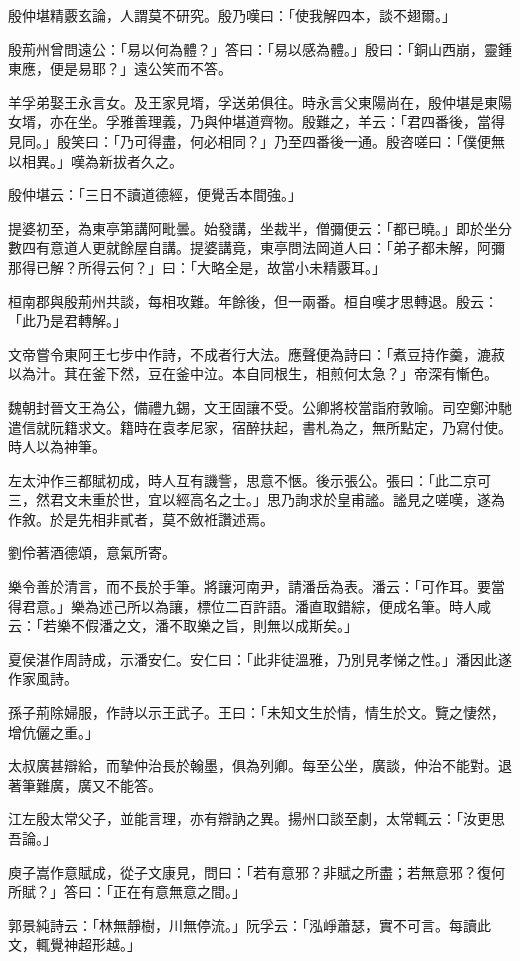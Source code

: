 殷仲堪精覈玄論，人謂莫不研究。殷乃嘆曰：「使我解四本，談不翅爾。」

殷荊州曾問遠公：「易以何為體？」答曰：「易以感為體。」殷曰：「銅山西崩，靈鍾東應，便是易耶？」遠公笑而不答。

羊孚弟娶王永言女。及王家見壻，孚送弟俱往。時永言父東陽尚在，殷仲堪是東陽女壻，亦在坐。孚雅善理義，乃與仲堪道齊物。殷難之，羊云：「君四番後，當得見同。」殷笑曰：「乃可得盡，何必相同？」乃至四番後一通。殷咨嗟曰：「僕便無以相異。」嘆為新拔者久之。

殷仲堪云：「三日不讀道德經，便覺舌本間強。」

提婆初至，為東亭第講阿毗曇。始發講，坐裁半，僧彌便云：「都已曉。」即於坐分數四有意道人更就餘屋自講。提婆講竟，東亭問法岡道人曰：「弟子都未解，阿彌那得已解？所得云何？」曰：「大略全是，故當小未精覈耳。」

桓南郡與殷荊州共談，每相攻難。年餘後，但一兩番。桓自嘆才思轉退。殷云：「此乃是君轉解。」

文帝嘗令東阿王七步中作詩，不成者行大法。應聲便為詩曰：「煮豆持作羹，漉菽以為汁。萁在釜下然，豆在釜中泣。本自同根生，相煎何太急？」帝深有慚色。

魏朝封晉文王為公，備禮九錫，文王固讓不受。公卿將校當詣府敦喻。司空鄭沖馳遣信就阮籍求文。籍時在袁孝尼家，宿醉扶起，書札為之，無所點定，乃寫付使。時人以為神筆。

左太沖作三都賦初成，時人互有譏訾，思意不愜。後示張公。張曰：「此二京可三，然君文未重於世，宜以經高名之士。」思乃詢求於皇甫謐。謐見之嗟嘆，遂為作敘。於是先相非貳者，莫不斂袵讚述焉。

劉伶著酒德頌，意氣所寄。

樂令善於清言，而不長於手筆。將讓河南尹，請潘岳為表。潘云：「可作耳。要當得君意。」樂為述己所以為讓，標位二百許語。潘直取錯綜，便成名筆。時人咸云：「若樂不假潘之文，潘不取樂之旨，則無以成斯矣。」

夏侯湛作周詩成，示潘安仁。安仁曰：「此非徒溫雅，乃別見孝悌之性。」潘因此遂作家風詩。

孫子荊除婦服，作詩以示王武子。王曰：「未知文生於情，情生於文。覽之悽然，增伉儷之重。」

太叔廣甚辯給，而摯仲治長於翰墨，俱為列卿。每至公坐，廣談，仲治不能對。退著筆難廣，廣又不能答。

江左殷太常父子，並能言理，亦有辯訥之異。揚州口談至劇，太常輒云：「汝更思吾論。」

庾子嵩作意賦成，從子文康見，問曰：「若有意邪？非賦之所盡；若無意邪？復何所賦？」答曰：「正在有意無意之間。」

郭景純詩云：「林無靜樹，川無停流。」阮孚云：「泓崢蕭瑟，實不可言。每讀此文，輒覺神超形越。」

